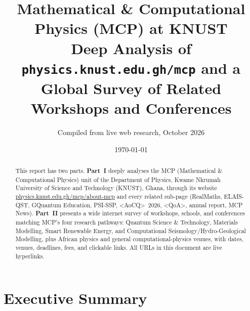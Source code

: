 \documentclass[11pt,a4paper]{article}
\title{\textbf{Mathematical \& Computational Physics (MCP) at KNUST}\\[0.4em]
\large Deep Analysis of \texttt{physics.knust.edu.gh/mcp} and a Global Survey of Related Workshops and Conferences}
\author{Compiled from live web research, October 2026}
\date{\today}
\begin{document}
\maketitle

\begin{abstract}
\noindent This report has two parts. \textbf{Part~I} deeply analyses the MCP (Mathematical \& Computational Physics) unit of the Department of Physics, Kwame Nkrumah University of Science and Technology (KNUST), Ghana, through its website \href{https://physics.knust.edu.gh/mcp/about-mcp}{physics.knust.edu.gh/mcp/about-mcp} and every related sub-page (RealMaths, ELAIS-QST, GQuantum Education, PSI-SSP, \textless AoC\textbar Q\textgreater\ 2026, \textless QoA\textgreater, annual report, MCP News). \textbf{Part~II} presents a wide internet survey of workshops, schools, and conferences matching MCP's four research pathways: Quantum Science \& Technology, Materials Modelling, Smart Renewable Energy, and Computational Seismology/Hydro-Geological Modelling, plus African physics and general computational-physics venues, with dates, venues, deadlines, fees, and clickable links. All URLs in this document are live hyperlinks.
\end{abstract}

\tableofcontents
\newpage

\section{Executive Summary}
\end{document}
